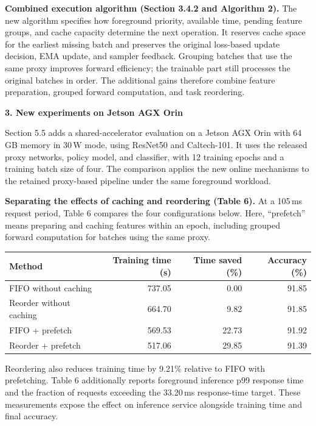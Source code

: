 \documentclass[11pt,letterpaper]{article}
\begin{document}
\textbf{Combined execution algorithm (Section 3.4.2 and Algorithm 2).}
The new algorithm specifies how foreground priority, available time, pending feature groups, and cache capacity determine the next operation. It reserves cache space for the earliest missing batch and preserves the original loss-based update decision, EMA update, and sampler feedback. Grouping batches that use the same proxy improves forward efficiency; the trainable part still processes the original batches in order. The additional gains therefore combine feature preparation, grouped forward computation, and task reordering.

\newpage
\textbf{3. New experiments on Jetson AGX Orin}

Section 5.5 adds a shared-accelerator evaluation on a Jetson AGX Orin with 64\,GB memory in 30\,W mode, using ResNet50 and Caltech-101. It uses the released proxy networks, policy model, and classifier, with 12 training epochs and a training batch size of four. The comparison applies the new online mechanisms to the retained proxy-based pipeline under the same foreground workload.

\textbf{Separating the effects of caching and reordering (Table 6).}
At a 105\,ms request period, Table 6 compares the four configurations below. Here, ``prefetch'' means preparing and caching features within an epoch, including grouped forward computation for batches using the same proxy.

\begin{center}
\begin{tabular}{@{}lrrr@{}}
\toprule
Method & Training time (s) & Time saved (\%) & Accuracy (\%) \\
\midrule
FIFO without caching & 737.05 & 0.00 & 91.85 \\
Reorder without caching & 664.70 & 9.82 & 91.85 \\
FIFO + prefetch & 569.53 & 22.73 & 91.92 \\
Reorder + prefetch & 517.06 & 29.85 & 91.39 \\
\bottomrule
\end{tabular}
\end{center}

Reordering also reduces training time by 9.21\% relative to FIFO with prefetching. Table 6 additionally reports foreground inference p99 response time and the fraction of requests exceeding the 33.20\,ms response-time target. These measurements expose the effect on inference service alongside training time and final accuracy.
\end{document}
